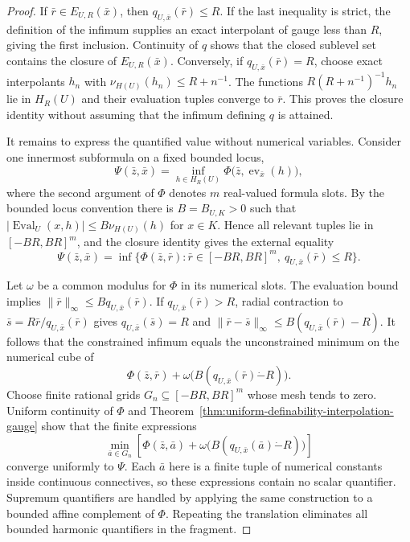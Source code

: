 \documentclass{amsart}
\theoremstyle{definition}
\theoremstyle{remark}
\newcommand{\dotminus}{\mathbin{\dot{-}}}
\numberwithin{equation}{section}
\begin{document}
\begin{proof}
	If $\bar r\in E_{U,R}(\bar x)$, then $q_{U,\bar x}(\bar r)\le R$. If the last inequality is strict, the definition of the infimum supplies an exact interpolant of gauge less than $R$, giving the first inclusion. Continuity of $q$ shows that the closed sublevel set contains the closure of $E_{U,R}(\bar x)$. Conversely, if $q_{U,\bar x}(\bar r)=R$, choose exact interpolants $h_n$ with $\nu_{H(U)}(h_n)\le R+n^{-1}$. The functions $R(R+n^{-1})^{-1}h_n$ lie in $H_R(U)$ and their evaluation tuples converge to $\bar r$. This proves the closure identity without assuming that the infimum defining $q$ is attained.
	
	It remains to express the quantified value without numerical variables. Consider one innermost subformula on a fixed bounded locus,
	$$\Psi(\bar z,\bar x)=\inf_{h\in H_R(U)}\Phi\bigl(\bar z,\operatorname{ev}_{\bar x}(h)\bigr),$$
	where the second argument of $\Phi$ denotes $m$ real-valued formula slots. By the bounded locus convention there is $B=B_{U,K}>0$ such that $|\operatorname{Eval}_U(x,h)|\le B\nu_{H(U)}(h)$ for $x\in K$. Hence all relevant tuples lie in $[-BR,BR]^m$, and the closure identity gives the external equality
	$$\Psi(\bar z,\bar x)=\inf\{\Phi(\bar z,\bar r):\bar r\in[-BR,BR]^m,\ q_{U,\bar x}(\bar r)\le R\}.$$
	
	Let $\omega$ be a common modulus for $\Phi$ in its numerical slots. The evaluation bound implies $\|\bar r\|_\infty\le Bq_{U,\bar x}(\bar r)$. If $q_{U,\bar x}(\bar r)>R$, radial contraction to $\bar s=R\bar r/q_{U,\bar x}(\bar r)$ gives $q_{U,\bar x}(\bar s)=R$ and $\|\bar r-\bar s\|_\infty\le B(q_{U,\bar x}(\bar r)-R)$. It follows that the constrained infimum equals the unconstrained minimum on the numerical cube of
	$$\Phi(\bar z,\bar r)+\omega\bigl(B(q_{U,\bar x}(\bar r)\dotminus R)\bigr).$$
	Choose finite rational grids $G_n\subseteq[-BR,BR]^m$ whose mesh tends to zero. Uniform continuity of $\Phi$ and Theorem~\ref{thm:uniform-definability-interpolation-gauge} show that the finite expressions
	$$\min_{\bar a\in G_n}\left[\Phi(\bar z,\bar a)+\omega\bigl(B(q_{U,\bar x}(\bar a)\dotminus R)\bigr)\right]$$
	converge uniformly to $\Psi$. Each $\bar a$ here is a finite tuple of numerical constants inside continuous connectives, so these expressions contain no scalar quantifier. Supremum quantifiers are handled by applying the same construction to a bounded affine complement of $\Phi$. Repeating the translation eliminates all bounded harmonic quantifiers in the fragment.
\end{proof}
\end{document}
